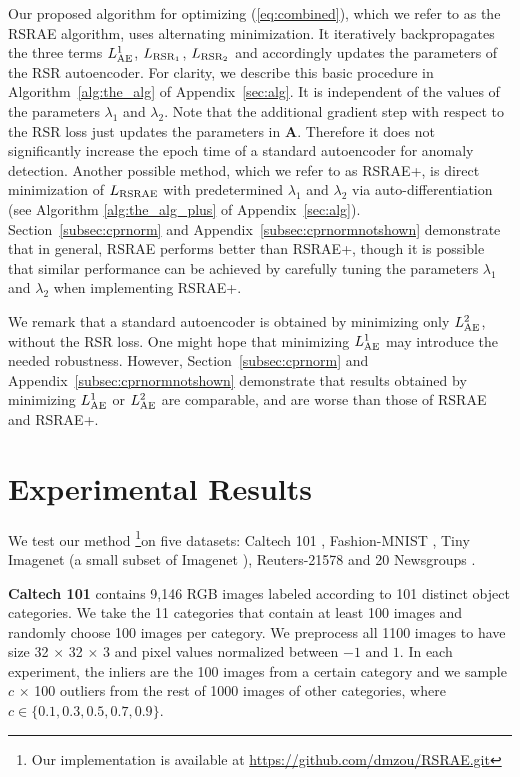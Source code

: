 \documentclass{article} \usepackage{iclr2020_conference,times}
\def\Secref#1{Section~\ref{#1}}
\def\eqref#1{(\ref{#1})}
\def\rmA{{\mathbf{A}}}
\begin{document}
Our proposed algorithm for optimizing 
\eqref{eq:combined}, which we refer to as the RSRAE algorithm, uses alternating minimization. It iteratively backpropagates the three terms $L_{\rm{AE}}^1$, $L_{\rm{RSR_1}}$, $L_{\rm{RSR_2}}$ and accordingly updates the parameters of the RSR autoencoder. 
For clarity, we describe this basic procedure in Algorithm~\ref{alg:the_alg} of Appendix~\ref{sec:alg}.
It is independent of the values of the parameters $\lambda_1$ and $\lambda_2$.
Note that the additional gradient step with respect to the RSR loss just updates the parameters in $\rmA$. Therefore it does not significantly increase the epoch time of a standard autoencoder for anomaly detection. Another possible method, which we refer to as RSRAE+, is direct minimization of $L_{\rm{RSRAE}}$ with predetermined $\lambda_1$ and $\lambda_2$ via auto-differentiation (see Algorithm \ref{alg:the_alg_plus} of Appendix~\ref{sec:alg}). \Secref{subsec:cprnorm} and Appendix~\ref{subsec:cprnormnotshown} demonstrate that in general, RSRAE performs better than RSRAE+, though it is possible that similar performance can be achieved by carefully tuning the parameters $\lambda_1$ and $\lambda_2$ when implementing RSRAE+. 

We remark that a standard autoencoder is obtained by minimizing only $L_{\rm{AE}}^2$, without the RSR loss. One might hope that minimizing $L_{\rm{AE}}^1$ may introduce the needed robustness. However, \Secref{subsec:cprnorm} and Appendix~\ref{subsec:cprnormnotshown} demonstrate that results obtained by minimizing $L_{\rm{AE}}^1$ or $L_{\rm{AE}}^2$ are comparable, and are worse than those of RSRAE and RSRAE+.





\section{{Experimental Results}}
\label{sec:real}



We test our method \footnote{{Our implementation is available at \url{https://github.com/dmzou/RSRAE.git}}}on five datasets: Caltech 101 \citep{fei2007learning}, Fashion-MNIST \citep{xiao2017fashion}, Tiny Imagenet (a small subset of Imagenet \citep{russakovsky2015imagenet}), Reuters-21578 \citep{lewis1997reuters} and 20 Newsgroups \citep{Lang95}. 



\textbf{Caltech 101} contains 9,146 RGB images labeled according to 101 distinct object categories. We take the 11 categories that contain at least 100 images and randomly choose 100 images per category. We preprocess all 1100 images to have  size 32 $\times$ 32 $\times$ 3 and pixel values normalized between $-1$ and $1$. In each experiment, the inliers are the 100 images from a certain category and we sample $c$ $\times$ 100 outliers from the rest of 1000 images of other categories, where $c \in \{0.1, 0.3, 0.5, 0.7, 0.9\}$.
\end{document}
